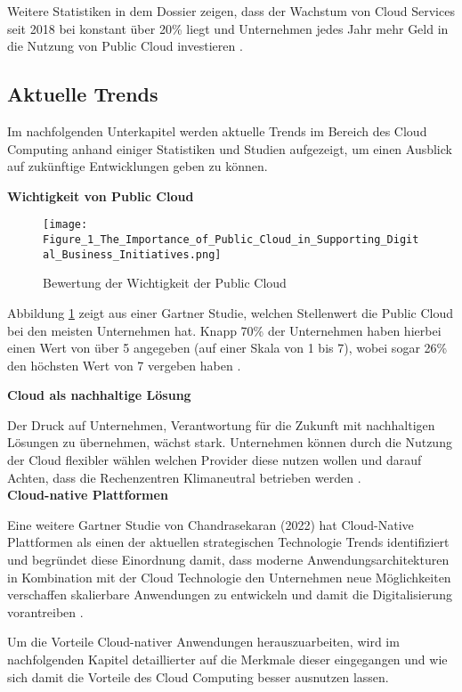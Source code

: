 Weitere Statistiken in dem Dossier zeigen, dass der Wachstum von Cloud Services seit 2018 bei konstant über 20\% liegt \cite[Vgl.][S. 6]{Statista2022} und Unternehmen jedes Jahr mehr Geld in die Nutzung von Public Cloud investieren \cite[Vgl.][S. 31f]{Statista2022}. \pagebreak

\subsection{Aktuelle Trends}
Im nachfolgenden Unterkapitel werden aktuelle Trends im Bereich des Cloud Computing anhand einiger Statistiken und Studien aufgezeigt, um einen Ausblick auf zukünftige Entwicklungen geben zu können.

\textbf{Wichtigkeit von Public Cloud}

\begin{figure}[H]
    \texttt{[image: Figure\_1\_The\_Importance\_of\_Public\_Cloud\_in\_Supporting\_Digital\_Business\_Initiatives.png]}
    \caption{Bewertung der Wichtigkeit der Public Cloud \cite[S. 2]{Ganly2022}}
    \label{fig:importance}
\end{figure}

Abbildung \ref{fig:importance} zeigt aus einer Gartner Studie, welchen Stellenwert die Public Cloud bei den meisten Unternehmen hat. Knapp 70\% der Unternehmen haben hierbei einen Wert von über 5 angegeben (auf einer Skala von 1 bis 7), wobei sogar 26\% den höchsten Wert von 7 vergeben haben \cite[Vgl.][S. 2]{Ganly2022}. \pagebreak

\textbf{Cloud als nachhaltige Lösung}

Der Druck auf Unternehmen, Verantwortung für die Zukunft mit nachhaltigen Lösungen zu übernehmen, wächst stark. Unternehmen können durch die Nutzung der Cloud flexibler wählen welchen Provider diese nutzen wollen und darauf Achten, dass die Rechenzentren Klimaneutral betrieben werden \cite[Vgl.][S. 24ff]{Illsley2022}. \\

\textbf{Cloud-native Plattformen}

Eine weitere Gartner Studie von Chandrasekaran (2022) hat Cloud-Native Plattformen als einen der aktuellen strategischen Technologie Trends identifiziert und begründet diese Einordnung damit, dass moderne Anwendungsarchitekturen in Kombination mit der Cloud Technologie den Unternehmen neue Möglichkeiten verschaffen skalierbare Anwendungen zu entwickeln und damit die Digitalisierung vorantreiben \cite[Vgl][S. 12]{Chandrasekaran2022}. 

Um die Vorteile Cloud-nativer Anwendungen herauszuarbeiten, wird im nachfolgenden Kapitel detaillierter auf die Merkmale dieser eingegangen und wie sich damit die Vorteile des Cloud Computing besser ausnutzen lassen. \pagebreak